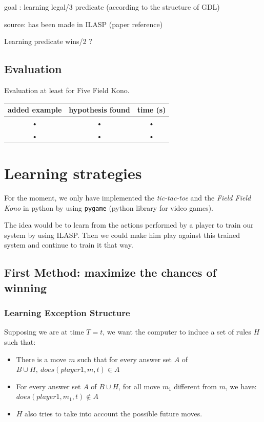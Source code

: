 \documentclass[12pt,twoside]{report}
\begin{document}
\bigskip

goal : learning legal/3 predicate (according to the structure of GDL)

\bigskip

source:  has been made in ILASP (paper reference)%

\bigskip

Learning predicate wins/2 ?

\section{Evaluation}

Evaluation at least for Five Field Kono.

\bigskip

\begin{tabular}{|c|c|c|}
\hline 
added example & hypothesis found & time (s) \\ 
\hline 
\hline
• & • & • \\ 
\hline 
• & • & • \\ 
\hline 
\end{tabular} 

\chapter{Learning strategies}

% 

For the moment, we only have implemented the \textit{tic-tac-toe} and the \textit{Field Field Kono} in python by using \texttt{pygame} (python library for video games).
\smallskip

The idea would be to learn from the actions performed by a player to train our system by using ILASP. Then we could make him play against this trained system and continue to train it that way.

\section{First Method: maximize the chances of winning}

\subsection{Learning Exception Structure}

Supposing we are at time $T=t$, we want the computer to induce a set of rules $H$ such that:
\begin{itemize}
\item There is a move $m$ such that for every answer set $A$ of $B\cup H,\:  does(player1, m, t)\in A$
\item For every answer set $A$ of $B\cup H$, for all move $m_1$ different from $m$, we have: $does(player1, m_1, t) \notin A$
\item $H$ also tries to take into account the possible future moves.
\end{itemize}
\end{document}
